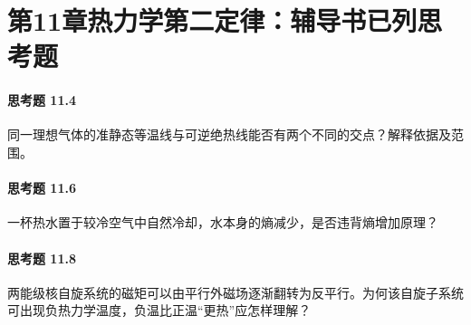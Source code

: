 \section*{第11章\quad 热力学第二定律：辅导书已列思考题}
\paragraph{思考题 11.4}
同一理想气体的准静态等温线与可逆绝热线能否有两个不同的交点？解释依据及范围。

\paragraph{思考题 11.6}
一杯热水置于较冷空气中自然冷却，水本身的熵减少，是否违背熵增加原理？

\paragraph{思考题 11.8}
两能级核自旋系统的磁矩可以由平行外磁场逐渐翻转为反平行。为何该自旋子系统可出现负热力学温度，负温比正温“更热”应怎样理解？
